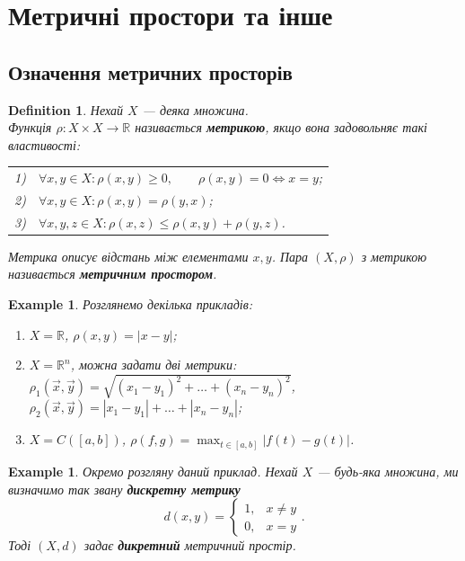 \documentclass[a4paper, 10pt]{article}
\theoremstyle{theoremdd}
\theoremstyle{theoremdd}
\newtheorem{definition}[theorem]{Definition}
\theoremstyle{theoremdd}
\theoremstyle{theoremdd}
\newtheorem{example}[theorem]{Example}
\theoremstyle{theoremdd}
\theoremstyle{theoremdd}
\theoremstyle{theoremdd}
\theoremstyle{theoremdd}
\begin{document}
\tableofcontents
\newpage

\section{Метричні простори та інше}
\subsection{Означення метричних просторів}
\begin{definition}
Нехай $X$ --- деяка множина.\\
Функція $\rho \colon X \times X \to \mathbb{R}$ називається \textbf{метрикою}, якщо вона задовольняє такі властивості:
\begin{center}
\begin{tabular}{ll}
1) & $\forall x,y \in X: \rho(x,y) \geq 0 ,\qquad \rho(x,y) = 0 \iff x = y$; \\
2) & $\forall x,y \in X: \rho(x,y) = \rho(y,x)$; \\
3) & $\forall x,y,z \in X: \rho(x,z) \leq \rho(x,y) + \rho(y,z)$.
\end{tabular}
\end{center}
Метрика описує відстань між елементами $x,y$. Пара $(X,\rho)$ з метрикою називається \textbf{метричним простором}.
\end{definition}

\begin{example}
Розглянемо декілька прикладів:
\begin{enumerate}[nosep,wide=0pt,label={\arabic*)}]
\item $X = \mathbb{R}$, \qquad $\rho(x,y) = |x-y|$;
\item $X = \mathbb{R}^n$, можна задати дві метрики: \\
$\rho_1(\vec{x}, \vec{y}) = \sqrt{(x_1-y_1)^2 + \dots + (x_n-y_n)^2}$, \qquad $\rho_2(\vec{x}, \vec{y}) = |x_1-y_1|+\dots+|x_n-y_n|$;
\item $X = C([a,b])$, \qquad $\displaystyle \rho(f,g) = \max_{t \in [a,b]} |f(t)-g(t)|$.
\end{enumerate}
\end{example}

\begin{example}
Окремо розгляну даний приклад. Нехай $X$ --- будь-яка множина, ми визначимо так звану \textbf{дискретну метрику} 
\[
d(x,y) = \begin{cases} 1, & x \neq y \\ 0, & x = y \end{cases}.
\]
Тоді $(X,d)$ задає \textbf{дикретний} метричний простір.
\end{example}
\end{document}
